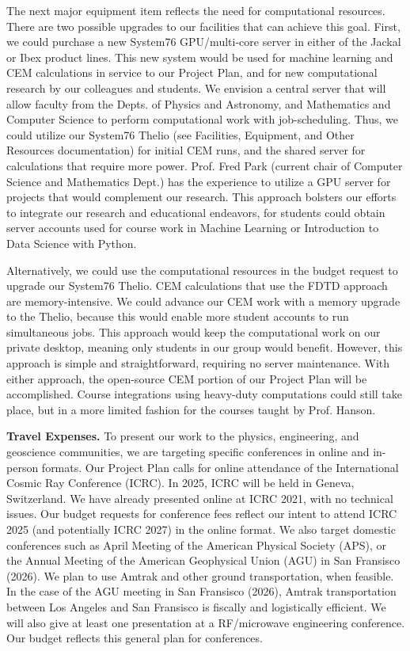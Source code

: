 \documentclass[10pt]{amsart}
\theoremstyle{definition}
\numberwithin{equation}{section}
\begin{document}
The next major equipment item reflects the need for computational resources.  There are two possible upgrades to our facilities that can achieve this goal.  First, we could purchase a new System76 GPU/multi-core server in either of the Jackal or Ibex product lines.  This new system would be used for machine learning and CEM calculations in service to our Project Plan, and for new computational research by our colleagues and students.  We envision a central server that will allow faculty from the Depts. of Physics and Astronomy, and Mathematics and Computer Science to perform computational work with job-scheduling.  Thus, we could utilize our System76 Thelio (see Facilities, Equipment, and Other Resources documentation) for initial CEM runs, and the shared server for calculations that require more power.  Prof. Fred Park (current chair of Computer Science and Mathematics Dept.) has the experience to utilize a GPU server for projects that would complement our research.  This approach bolsters our efforts to integrate our research and educational endeavors, for students could obtain server accounts used for course work in Machine Learning or Introduction to Data Science with Python. 

Alternatively, we could use the computational resources in the budget request to upgrade our System76 Thelio.  CEM calculations that use the FDTD approach are memory-intensive.  We could advance our CEM work with a memory upgrade to the Thelio, because this would enable more student accounts to run simultaneous jobs.  This approach would keep the computational work on our private desktop, meaning only students in our group would benefit.  However, this approach is simple and straightforward, requiring no server maintenance.  With either approach, the open-source CEM portion of our Project Plan will be accomplished.  Course integrations using heavy-duty computations could still take place, but in a more limited fashion for the courses taught by Prof. Hanson. 

\textbf{Travel Expenses.}  To present our work to the physics, engineering, and geoscience communities, we are targeting specific conferences in online and in-person formats.  Our Project Plan calls for online attendance of the International Cosmic Ray Conference (ICRC).  In 2025, ICRC will be held in Geneva, Switzerland.  We have already presented online at ICRC 2021, with no technical issues.  Our budget requests for conference fees reflect our intent to attend ICRC 2025 (and potentially ICRC 2027) in the online format.  We also target domestic conferences such as April Meeting of the American Physical Society (APS), or the Annual Meeting of the American Geophysical Union (AGU) in San Fransisco (2026).  We plan to use Amtrak and other ground transportation, when feasible.  In the case of the AGU meeting in San Fransisco (2026), Amtrak transportation between Los Angeles and San Fransisco is fiscally and logistically efficient.  We will also give at least one presentation at a RF/microwave engineering conference.  Our budget reflects this general plan for conferences. 
\end{document}
